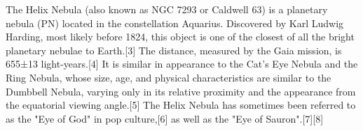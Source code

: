 The Helix Nebula (also known as NGC 7293 or Caldwell 63) is a planetary nebula (PN) located in the constellation Aquarius. Discovered by Karl Ludwig Harding, most likely before 1824, this object is one of the closest of all the bright planetary nebulae to Earth.[3] The distance, measured by the Gaia mission, is 655±13 light-years.[4] It is similar in appearance to the Cat's Eye Nebula and the Ring Nebula, whose size, age, and physical characteristics are similar to the Dumbbell Nebula, varying only in its relative proximity and the appearance from the equatorial viewing angle.[5] The Helix Nebula has sometimes been referred to as the "Eye of God" in pop culture,[6] as well as the "Eye of Sauron".[7][8]
